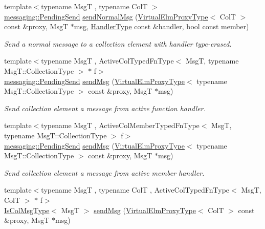 \begin{DoxyCompactItemize}
{\footnotesize template$<$typename MsgT , typename ColT $>$ }\\\hyperlink{structvt_1_1messaging_1_1_pending_send}{messaging\+::\+Pending\+Send} \hyperlink{structvt_1_1vrt_1_1collection_1_1_collection_manager_a9b58618d5d3eec7ac198b7c465288599}{send\+Normal\+Msg} (\hyperlink{namespacevt_1_1vrt_a620a5c8c59d13e513f690c74b4af516f}{Virtual\+Elm\+Proxy\+Type}$<$ ColT $>$ const \&proxy, MsgT $\ast$msg, \hyperlink{namespacevt_af64846b57dfcaf104da3ef6967917573}{Handler\+Type} const \&handler, bool const member)
\begin{DoxyCompactList}\small\item\em Send a normal message to a collection element with handler type-\/erased. \end{DoxyCompactList}\item 
{\footnotesize template$<$typename MsgT , Active\+Col\+Typed\+Fn\+Type$<$ Msg\+T, typename Msg\+T\+::\+Collection\+Type $>$ $\ast$ f$>$ }\\\hyperlink{structvt_1_1messaging_1_1_pending_send}{messaging\+::\+Pending\+Send} \hyperlink{structvt_1_1vrt_1_1collection_1_1_collection_manager_a3165b258fab15c35985b3f9b8ef0dbe7}{send\+Msg} (\hyperlink{namespacevt_1_1vrt_a620a5c8c59d13e513f690c74b4af516f}{Virtual\+Elm\+Proxy\+Type}$<$ typename Msg\+T\+::\+Collection\+Type $>$ const \&proxy, MsgT $\ast$msg)
\begin{DoxyCompactList}\small\item\em Send collection element a message from active function handler. \end{DoxyCompactList}\item 
{\footnotesize template$<$typename MsgT , Active\+Col\+Member\+Typed\+Fn\+Type$<$ Msg\+T, typename Msg\+T\+::\+Collection\+Type $>$ f$>$ }\\\hyperlink{structvt_1_1messaging_1_1_pending_send}{messaging\+::\+Pending\+Send} \hyperlink{structvt_1_1vrt_1_1collection_1_1_collection_manager_a3165b258fab15c35985b3f9b8ef0dbe7}{send\+Msg} (\hyperlink{namespacevt_1_1vrt_a620a5c8c59d13e513f690c74b4af516f}{Virtual\+Elm\+Proxy\+Type}$<$ typename Msg\+T\+::\+Collection\+Type $>$ const \&proxy, MsgT $\ast$msg)
\begin{DoxyCompactList}\small\item\em Send collection element a message from active member handler. \end{DoxyCompactList}\item 
{\footnotesize template$<$typename MsgT , typename ColT , Active\+Col\+Typed\+Fn\+Type$<$ Msg\+T, Col\+T $>$ $\ast$ f$>$ }\\\hyperlink{structvt_1_1vrt_1_1collection_1_1_collection_manager_a21c21612c806016788057aeab142af20}{Is\+Col\+Msg\+Type}$<$ MsgT $>$ \hyperlink{structvt_1_1vrt_1_1collection_1_1_collection_manager_a55777b57bfad6c9d87d946ed773a391d}{send\+Msg} (\hyperlink{namespacevt_1_1vrt_a620a5c8c59d13e513f690c74b4af516f}{Virtual\+Elm\+Proxy\+Type}$<$ ColT $>$ const \&proxy, MsgT $\ast$msg)

\end{DoxyCompactItemize}
